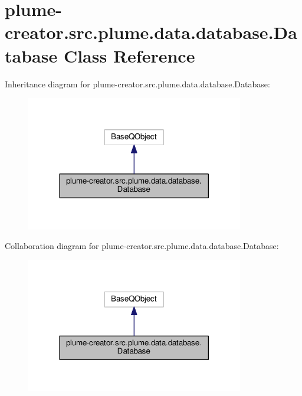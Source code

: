 \hypertarget{classplume-creator_1_1src_1_1plume_1_1data_1_1database_1_1_database}{}\section{plume-\/creator.src.\+plume.\+data.\+database.\+Database Class Reference}
\label{classplume-creator_1_1src_1_1plume_1_1data_1_1database_1_1_database}


Inheritance diagram for plume-\/creator.src.\+plume.\+data.\+database.\+Database\+:\nopagebreak
\begin{figure}[H]
\begin{center}
\leavevmode
\includegraphics[width=269pt]{classplume-creator_1_1src_1_1plume_1_1data_1_1database_1_1_database__inherit__graph}
\end{center}
\end{figure}


Collaboration diagram for plume-\/creator.src.\+plume.\+data.\+database.\+Database\+:\nopagebreak
\begin{figure}[H]
\begin{center}
\leavevmode
\includegraphics[width=269pt]{classplume-creator_1_1src_1_1plume_1_1data_1_1database_1_1_database__coll__graph}
\end{center}
\end{figure}
